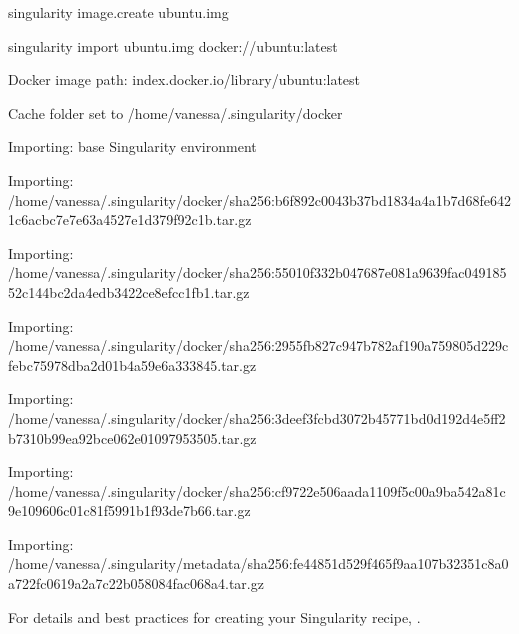 \documentclass[letterpaper,10pt,english]{sphinxmanual}
\begin{document}
%
\begin{sphinxVerbatim}[commandchars=\\\{\}]
\PYGZdl{} singularity image.create ubuntu.img

singularity import ubuntu.img docker://ubuntu:latest

Docker image path: index.docker.io/library/ubuntu:latest

Cache folder set to /home/vanessa/.singularity/docker

Importing: base Singularity environment

Importing: /home/vanessa/.singularity/docker/sha256:b6f892c0043b37bd1834a4a1b7d68fe6421c6acbc7e7e63a4527e1d379f92c1b.tar.gz

Importing: /home/vanessa/.singularity/docker/sha256:55010f332b047687e081a9639fac04918552c144bc2da4edb3422ce8efcc1fb1.tar.gz

Importing: /home/vanessa/.singularity/docker/sha256:2955fb827c947b782af190a759805d229cfebc75978dba2d01b4a59e6a333845.tar.gz

Importing: /home/vanessa/.singularity/docker/sha256:3deef3fcbd3072b45771bd0d192d4e5ff2b7310b99ea92bce062e01097953505.tar.gz

Importing: /home/vanessa/.singularity/docker/sha256:cf9722e506aada1109f5c00a9ba542a81c9e109606c01c81f5991b1f93de7b66.tar.gz

Importing: /home/vanessa/.singularity/metadata/sha256:fe44851d529f465f9aa107b32351c8a0a722fc0619a2a7c22b058084fac068a4.tar.gz
\end{sphinxVerbatim}

For details and best practices for creating your Singularity recipe, {\hyperref[\detokenize{container_recipes:container-recipes}]{}}.



\renewcommand{\indexname}{Index}
\printindex
\end{document}
